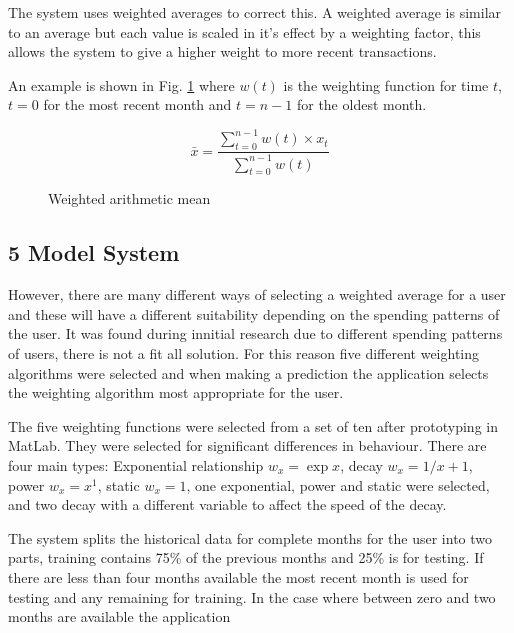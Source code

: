 The system uses weighted averages to correct this. A weighted average is similar to an average but each value is scaled in it's effect by a weighting factor, this allows the system to give a higher weight to more recent transactions.

An example is shown in Fig. \ref{fig:weighting} where $w(t)$ is the weighting function for time $t$, $t = 0$ for the most recent month and $t = n - 1$ for the oldest month. 

\begin{figure}[h]
    \centering
    \[
        \bar{x} = 
        \frac{
                \sum\limits^{n-1}_{t=0}{w(t) \times x_t}
            }{
                \sum\limits_{t=0}^{n-1}{w(t)}
        } 
    \]
    \caption{Weighted arithmetic mean}
    \label{fig:weighting}
\end{figure}

\subsection{5 Model System}
However, there are many different ways of selecting a weighted average for a user and these will have a different suitability depending on the spending patterns of the user. It was found during innitial research due to different spending patterns of users, there is not a fit all solution. For this reason five different weighting algorithms were selected and when making a prediction the application selects the weighting algorithm most appropriate for the user.

The five weighting functions were selected from a set of ten after prototyping in MatLab. They were selected for significant differences in behaviour. There are four main types: Exponential relationship $w_x = \exp{x}$, decay $w_x = {1}/{x + 1}$, power $w_x = x^1 $, static $w_x = 1$, one exponential, power and static were selected, and two decay with a different variable to affect the speed of the decay. 


The system splits the historical data for complete months for the user into two parts, training contains 75\% of the previous months and 25\% is for testing. If there are less than four months available the most recent month is used for testing and any remaining for training. In the case where between zero and two months are available the application 

